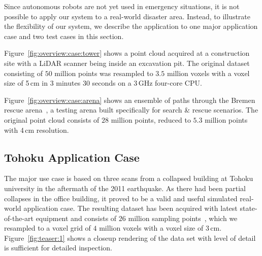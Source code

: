 \documentclass{egpubl}
\begin{document}
Since autonomous robots are not yet used in emergency situations, it is not possible to apply our system to a real-world disaster area. Instead, to illustrate the flexibility of our system, we describe the application to one major application case and two test cases in this section.

 Figure~\ref{fig:overview:case:tower} shows a point cloud acquired at a construction site with a LiDAR scanner being inside an excavation pit. The original dataset consisting of $50$ million points was resampled to $3.5$ million voxels with a voxel size of 5\,cm in 3 minutes 30 seconds on a 3\,GHz four-core CPU. 

 Figure~\ref{fig:overview:case:arena} shows an ensemble of paths through the Bremen rescue arena~\cite{varsadan08}, a testing arena built specifically for search \& rescue scenarios. The original point cloud consists of $28$ million points, reduced to $5.3$ million points with 4\,cm resolution.

\subsection{Tohoku Application Case} \label{sec:results:applicationcase}

The major use case is based on three scans from a collapsed building at Tohoku university in the aftermath of the 2011 earthquake. As there had been partial collapses in the office building, it proved to be a valid and useful simulated real-world application case. The resulting dataset has been acquired with latest state-of-the-art equipment and consists of $26$ million sampling points~\cite{journals/jfr/NagataniKOOYTNYKFK13}, which we resampled to a voxel grid of $4$ million voxels with a voxel size of 3\,cm. Figure~\ref{fig:teaser:1} shows a closeup rendering of the data set with level of detail is sufficient for detailed inspection.
\end{document}

